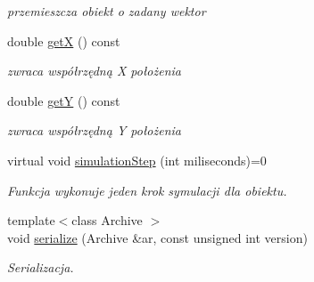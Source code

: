 \begin{DoxyCompactItemize}
\begin{DoxyCompactList}\small\item\em przemieszcza obiekt o zadany wektor \end{DoxyCompactList}\item 
\hypertarget{classMapObject_ad1a16784ebfef39db99b003b007e4aaa}{double \hyperlink{classMapObject_ad1a16784ebfef39db99b003b007e4aaa}{get\-X} () const }\label{classMapObject_ad1a16784ebfef39db99b003b007e4aaa}

\begin{DoxyCompactList}\small\item\em zwraca współrzędną X położenia \end{DoxyCompactList}\item 
\hypertarget{classMapObject_a1a14c2702a4afff02e8c037c1aebf73c}{double \hyperlink{classMapObject_a1a14c2702a4afff02e8c037c1aebf73c}{get\-Y} () const }\label{classMapObject_a1a14c2702a4afff02e8c037c1aebf73c}

\begin{DoxyCompactList}\small\item\em zwraca współrzędną Y położenia \end{DoxyCompactList}\item 
virtual void \hyperlink{classMapObject_a8bd8926db59af00a61b8860352abfdd9}{simulation\-Step} (int miliseconds)=0
\begin{DoxyCompactList}\small\item\em Funkcja wykonuje jeden krok symulacji dla obiektu. \end{DoxyCompactList}\item 
{\footnotesize template$<$class Archive $>$ }\\void \hyperlink{classMapObject_af7bd38411bbc26af1e0133538688d909}{serialize} (Archive \&ar, const unsigned int version)
\begin{DoxyCompactList}\small\item\em Serializacja. \end{DoxyCompactList}\end{DoxyCompactItemize}
